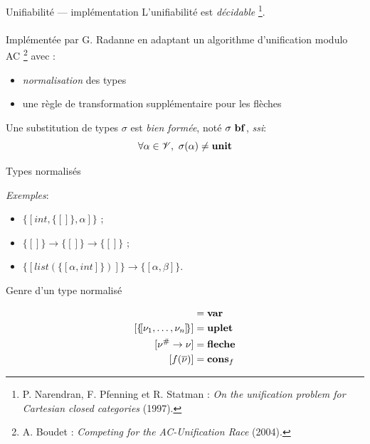 \documentclass[serif]{beamer}
\newcommand{\exemples}{\textit{Exemples}\xspace}
\newcommand{\mset}[1]{\{\![#1]\!\}}
\newcommand{\ssi}{\textit{ssi}\xspace}
\newcommand{\unit}{\bold{unit}}
\newcommand{\V}{\mathscr{V}}
\newcommand{\F}{\mathscr{F}}
\newcommand{\G}{\mathscr{G}}
\newcommand{\N}{\mathrm{N}}
\begin{document}
\begin{frame}{Unifiabilité — implémentation}
\small
L'unifiabilité est \emph{décidable} \footnote{P. Narendran, F. Pfenning et R. Statman : \textit{On the unification problem for Cartesian closed categories} (1997).}.
\\~\\
Implémentée par G. Radanne en adaptant un algorithme d'unification modulo AC \footnote{A. Boudet : \textit{Competing for the AC-Unification Race} (2004).} avec :
\begin{itemize}
  \item \emph{normalisation} des types
  \item une règle de transformation supplémentaire pour les flèches
\end{itemize}
\smallskip
Une substitution de types $\sigma$ est \emph{bien formée}, noté $\sigma\ \bold{bf}$, \ssi :
  \[ \forall \alpha \in \V,\ \sigma (\alpha) \neq \unit \]
\end{frame}


\begin{frame}{Types normalisés}
\exemples :
\begin{itemize}
  \item $\mset{int, \mset{}, \alpha}$ ;
  \item $\mset{} \rightarrow \mset{} \rightarrow \mset{}$ ;
  \item $\mset{list (\mset{\alpha, int})} \rightarrow \mset{\alpha, \beta}$.
\end{itemize}
\end{frame}


\begin{frame}{Genre d'un type normalisé}
\small
{}
\begin{align*}
    [ \alpha ] &= \bold{var}
  \\
    [ \mset{\nu_1, \dots, \nu_n} ] &= \bold{uplet}
  \\
    [ \nu^\# \rightarrow \nu ] &= \bold{fleche}
  \\
    [ f (\overline \nu) ] &= \bold{cons}_f
\end{align*}
\end{frame}
\end{document}
